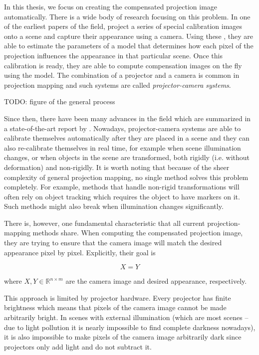 In this thesis, we focus on creating the compensated projection image automatically. There is a wide body of research focusing on this problem. In one of the earliest papers of the field, \citet*{Grossberg2004} project a series of special calibration images onto a scene and capture their appearance using a camera. Using these , they are able to estimate the parameters of a model that determines how each pixel of the projection influences the appearance in that particular scene. Once this calibration is ready, they are able to compute compensation images on the fly using the model. The combination of a projector and a camera is common in projection mapping and such systems are called \textit{projector-camera systems}.

{\color{red} TODO: figure of the general process}

Since then, there have been many advances in the field which are summarized in a state-of-the-art report by \citet*{Grundhofer2018}. Nowadays, projector-camera systems are able to calibrate themselves automatically after they are placed in a scene and they can also re-calibrate themselves in real time, for example when scene illumination changes, or when objects in the scene are transformed, both rigidly (i.e. without deformation) and non-rigidly. It is worth noting that because of the sheer complexity of general projection mapping, no single method solves this problem completely. For example, methods that handle non-rigid transformations will often rely on object tracking which requires the object to have markers on it. Such methods might also break when illumination changes significantly.

There is, however, one fundamental characteristic that all current projection-mapping methods share. When computing the compensated projection image, they are trying to ensure that the camera image will match the desired appearance pixel by pixel. Explicitly, their goal is

\[
    X = Y
\]

where \(X,Y \in \mathbb{R}^{n \times m}\) are the camera image and desired appearance, respectively.

This approach is limited by projector hardware. Every projector has finite brightness which means that pixels of the camera image cannot be made arbitrarily bright. In scenes with external illumination (which are most scenes -- due to light pollution it is nearly impossible to find complete darkness nowadays), it is also impossible to make pixels of the camera image arbitrarily dark since projectors only add light and do not subtract it.

